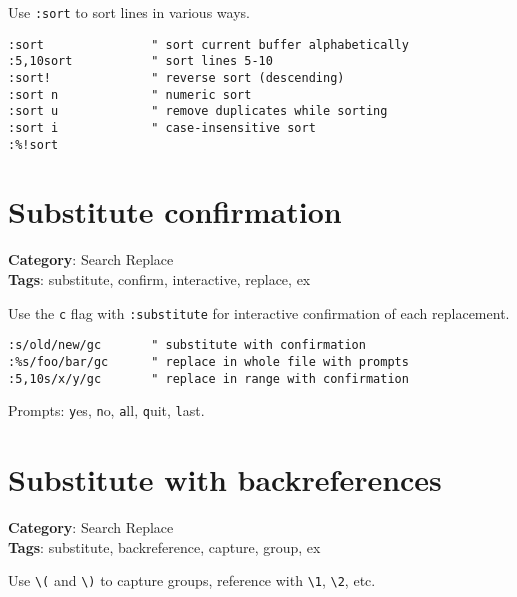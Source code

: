 {{{{Use {\footnotesize \Verb§:sort§} to sort lines in various ways.

\begin{Exa*}{}
\begin{Verbatim}[fontsize=\footnotesize, breaklines, breakanywhere]
:sort               " sort current buffer alphabetically
:5,10sort           " sort lines 5-10
:sort!              " reverse sort (descending)
:sort n             " numeric sort
:sort u             " remove duplicates while sorting
:sort i             " case-insensitive sort
:%!sort
\end{Verbatim}
\end{Exa*}

\section{Substitute confirmation}

\textbf{Category}: Search Replace\\ \textbf{Tags}: substitute, confirm, interactive, replace, ex
\vspace{0.5cm}

Use the {\footnotesize \Verb§c§} flag with {\footnotesize \Verb§:substitute§} for interactive confirmation of each replacement.

\begin{Exa*}{}
\begin{Verbatim}[fontsize=\footnotesize, breaklines, breakanywhere]
:s/old/new/gc       " substitute with confirmation
:%s/foo/bar/gc      " replace in whole file with prompts
:5,10s/x/y/gc       " replace in range with confirmation
\end{Verbatim}
\end{Exa*}

Prompts: {\footnotesize \Verb§y§}es, {\footnotesize \Verb§n§}o, {\footnotesize \Verb§a§}ll, {\footnotesize \Verb§q§}uit, {\footnotesize \Verb§l§}ast.

\section{Substitute with backreferences}

\textbf{Category}: Search Replace\\ \textbf{Tags}: substitute, backreference, capture, group, ex
\vspace{0.5cm}

Use {\footnotesize \Verb§\(§} and {\footnotesize \Verb§\)§} to capture groups, reference with {\footnotesize \Verb§\1§}, {\footnotesize \Verb§\2§}, etc.

}}}}
